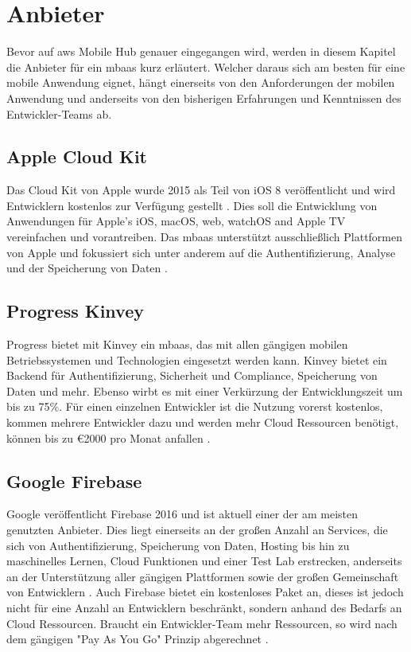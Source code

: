 \section{Anbieter}
Bevor auf \gls{aws} Mobile Hub genauer eingegangen wird, werden in diesem Kapitel die Anbieter für ein \gls{mbaas} kurz erläutert. Welcher daraus sich am besten für eine mobile Anwendung eignet, hängt einerseits von den Anforderungen der mobilen Anwendung und anderseits von den bisherigen Erfahrungen und Kenntnissen des Entwickler-Teams ab.

\subsection{Apple Cloud Kit}
Das Cloud Kit von Apple wurde 2015 als Teil von iOS 8 veröffentlicht und wird Entwicklern kostenlos zur Verfügung gestellt \cite{techbeacon}. Dies soll die Entwicklung von Anwendungen für Apple's iOS, macOS, web, watchOS and Apple TV vereinfachen und vorantreiben. Das \gls{mbaas} unterstützt ausschließlich Plattformen von Apple und fokussiert sich unter anderem auf die Authentifizierung, Analyse und der Speicherung von Daten \cite{applecloudkit}.

\subsection{Progress Kinvey}
Progress bietet mit Kinvey ein \gls{mbaas}, das mit allen gängigen mobilen Betriebssystemen und Technologien eingesetzt werden kann. Kinvey bietet ein Backend für Authentifizierung, Sicherheit und Compliance, Speicherung von Daten und mehr. Ebenso wirbt es mit einer Verkürzung der Entwicklungszeit um bis zu 75\%. Für einen einzelnen Entwickler ist die Nutzung vorerst kostenlos, kommen mehrere Entwickler dazu und werden mehr Cloud Ressourcen benötigt, können bis zu \euro{2000} pro Monat anfallen \cite{progresskinvey}.

\subsection{Google Firebase}
Google veröffentlicht Firebase 2016 und ist aktuell einer der am meisten genutzten Anbieter. Dies liegt einerseits an der großen Anzahl an Services, die sich von Authentifizierung, Speicherung von Daten, Hosting bis hin zu maschinelles Lernen, Cloud Funktionen und einer Test Lab erstrecken, anderseits an der Unterstützung aller gängigen Plattformen sowie der großen Gemeinschaft von Entwicklern \cite{techbeacon}. Auch Firebase bietet ein kostenloses Paket an, dieses ist jedoch nicht für eine Anzahl an Entwicklern beschränkt, sondern anhand des Bedarfs an Cloud Ressourcen. Braucht ein Entwickler-Team mehr Ressourcen, so wird nach dem gängigen "Pay As You Go" Prinzip abgerechnet \cite{googlefirebase}.

